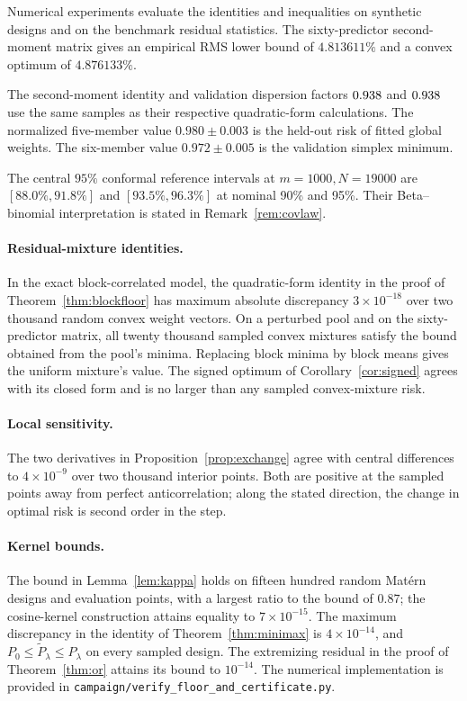 Numerical experiments evaluate the identities and inequalities on
synthetic designs and on the benchmark residual statistics. The sixty-predictor
second-moment matrix gives an empirical RMS lower bound of $4.813611\%$
and a convex optimum of $4.876133\%$.

The second-moment identity and validation dispersion factors $0.938$
and $0.938$ use the same samples as their respective quadratic-form
calculations. The normalized five-member value $0.980\pm0.003$ is the
held-out risk of fitted global weights. The six-member value
$0.972\pm0.005$ is the validation simplex minimum.

The central $95\%$ conformal reference intervals at $m=1000,N=19000$ are $[88.0\%,91.8\%]$ and $[93.5\%,96.3\%]$ at nominal 90\% and 95\%. Their Beta--binomial interpretation is stated in Remark~\ref{rem:covlaw}.

\paragraph{Residual-mixture identities.}
In the exact block-correlated model, the quadratic-form identity in the
proof of Theorem~\ref{thm:blockfloor} has maximum absolute discrepancy
$3\times10^{-18}$ over two thousand random convex weight vectors. On a
perturbed pool and on the sixty-predictor matrix, all twenty thousand
sampled convex mixtures satisfy the bound obtained from the pool's minima.
Replacing block minima by block means gives the uniform mixture's value.
The signed optimum of Corollary~\ref{cor:signed} agrees with its closed
form and is no larger than any sampled convex-mixture risk.

\paragraph{Local sensitivity.}
The two derivatives in Proposition~\ref{prop:exchange} agree with central
differences to $4\times10^{-9}$ over two thousand interior points. Both are
positive at the sampled points away from perfect anticorrelation; along
the stated direction, the change in optimal risk is second order in the step.

\paragraph{Kernel bounds.}
The bound in Lemma~\ref{lem:kappa} holds on fifteen hundred random
Mat\'ern designs and evaluation points, with a largest ratio to the bound
of $0.87$; the cosine-kernel construction attains equality to
$7\times10^{-15}$. The maximum discrepancy in the identity of
Theorem~\ref{thm:minimax} is $4\times10^{-14}$, and
$P_0\le\widetilde P_\lambda\le P_\lambda$ on every sampled design.
The extremizing residual in the proof of Theorem~\ref{thm:or} attains its
bound to $10^{-14}$. The numerical implementation is provided in
\texttt{campaign/verify\_floor\_and\allowbreak\_certificate.py}.
